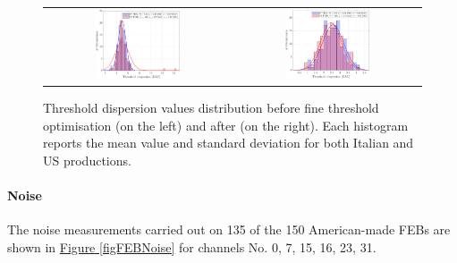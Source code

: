 \begin{figure}[h!]
    \centering
    \begin{tabular}{cc}
        \includegraphics[width=0.475\textwidth]{Images/chap2/results/thrdisp_bef.pdf} & \includegraphics[width=0.475\textwidth]{Images/chap2/results/thrdisp_aft.pdf}\\
    \end{tabular}
    \caption{Threshold dispersion values distribution before fine threshold optimisation (on the left) and after (on the right). Each histogram reports the mean value and standard deviation for both Italian and US productions.}
    \label{figFEBthreshold}
\end{figure}

\paragraph{Noise} The noise measurements carried out on 135 of the 150 American-made FEBs are shown in \hyperref[figFEBNoise]{Figure \ref{figFEBNoise}} for channels No. 0, 7, 15, 16, 23, 31.

